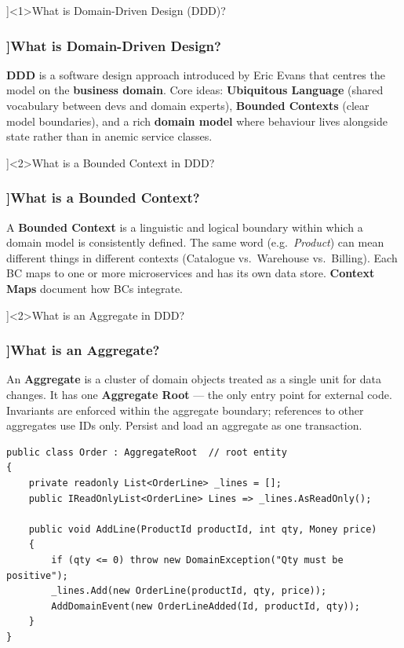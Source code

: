 
\QuestionSlide[\CategoryBadge[DDDColor!20]{DDD \& CQRS}]<1>{What is Domain-Driven Design (DDD)?}

\begin{frame}[fragile]
  \frametitle{\AnswerTitle[\CategoryBadge[DDDColor!20]{DDD \& CQRS}]{What is Domain-Driven Design?}}

  {\footnotesize
  \textbf{DDD} is a software design approach introduced by Eric Evans that centres the model on the \textbf{business domain}. Core ideas: \textbf{Ubiquitous Language} (shared vocabulary between devs and domain experts), \textbf{Bounded Contexts} (clear model boundaries), and a rich \textbf{domain model} where behaviour lives alongside state rather than in anemic service classes.
  }
\end{frame}

\QuestionSlide[\CategoryBadge[DDDColor!20]{DDD \& CQRS}]<2>{What is a Bounded Context in DDD?}

\begin{frame}[fragile]
  \frametitle{\AnswerTitle[\CategoryBadge[DDDColor!20]{DDD \& CQRS}]{What is a Bounded Context?}}

  {\footnotesize
  A \textbf{Bounded Context} is a linguistic and logical boundary within which a domain model is consistently defined. The same word (e.g.\ \emph{Product}) can mean different things in different contexts (Catalogue vs.\ Warehouse vs.\ Billing). Each BC maps to one or more microservices and has its own data store. \textbf{Context Maps} document how BCs integrate.
  }
\end{frame}

\QuestionSlide[\CategoryBadge[DDDColor!20]{DDD \& CQRS}]<2>{What is an Aggregate in DDD?}

\begin{frame}[fragile]
  \frametitle{\AnswerTitle[\CategoryBadge[DDDColor!20]{DDD \& CQRS}]{What is an Aggregate?}}

  {\footnotesize
  An \textbf{Aggregate} is a cluster of domain objects treated as a single unit for data changes. It has one \textbf{Aggregate Root} — the only entry point for external code. Invariants are enforced within the aggregate boundary; references to other aggregates use IDs only. Persist and load an aggregate as one transaction.
  }

  \begin{verbatim}
public class Order : AggregateRoot  // root entity
{
    private readonly List<OrderLine> _lines = [];
    public IReadOnlyList<OrderLine> Lines => _lines.AsReadOnly();

    public void AddLine(ProductId productId, int qty, Money price)
    {
        if (qty <= 0) throw new DomainException("Qty must be positive");
        _lines.Add(new OrderLine(productId, qty, price));
        AddDomainEvent(new OrderLineAdded(Id, productId, qty));
    }
}
  \end{verbatim}
\end{frame}

